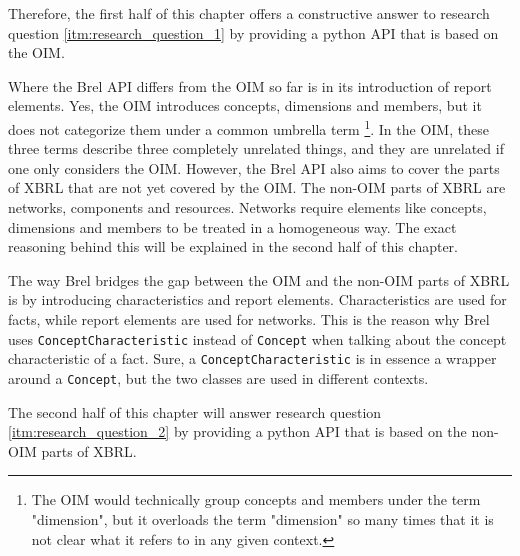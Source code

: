 Therefore, the first half of this chapter offers a constructive answer to research question \ref{itm:research_question_1} 
by providing a python API that is based on the OIM.

Where the Brel API differs from the OIM so far is in its introduction of report elements.
Yes, the OIM introduces concepts, dimensions and members, but it does not categorize them under a common umbrella term
\footnote{The OIM would technically group concepts and members under the term "dimension", 
but it overloads the term "dimension" so many times that it is not clear what it refers to in any given context.}.
In the OIM, these three terms describe three completely unrelated things, and they are unrelated if one only considers the OIM.
However, the Brel API also aims to cover the parts of XBRL that are not yet covered by the OIM.
The non-OIM parts of XBRL are networks, components and resources.
Networks require elements like concepts, dimensions and members to be treated in a homogeneous way.
The exact reasoning behind this will be explained in the second half of this chapter.

The way Brel bridges the gap between the OIM and the non-OIM parts of XBRL is by introducing characteristics and report elements.
Characteristics are used for facts, while report elements are used for networks.
This is the reason why Brel uses \texttt{ConceptCharacteristic} instead of \texttt{Concept} when talking about the concept characteristic of a fact.
Sure, a \texttt{ConceptCharacteristic} is in essence a wrapper around a \texttt{Concept}, 
but the two classes are used in different contexts.

The second half of this chapter will answer research question \ref{itm:research_question_2} 
by providing a python API that is based on the non-OIM parts of XBRL.

